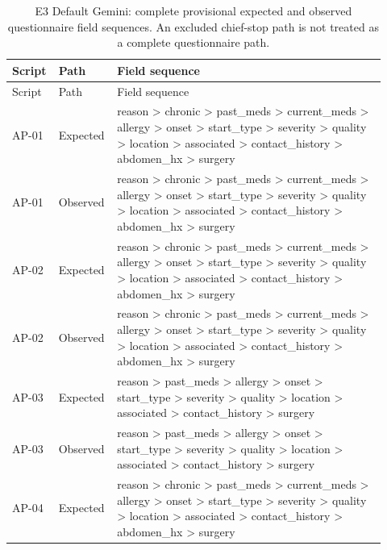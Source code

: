 \begingroup\small\setlength{\tabcolsep}{3pt}\renewcommand{\arraystretch}{1.15}
\begin{longtable}{>{\raggedright\arraybackslash}p{0.1\linewidth}>{\raggedright\arraybackslash}p{0.12\linewidth}>{\raggedright\arraybackslash}p{0.7\linewidth}}
\caption{E3 Default Gemini: complete provisional expected and observed questionnaire field sequences. An excluded chief-stop path is not treated as a complete questionnaire path.}\label{sup:e3pathsdefault}\\\hline
Script & Path & Field sequence \\ \hline
\endfirsthead
\hline
Script & Path & Field sequence \\ \hline
\endhead
\hline\endfoot
\hline\endlastfoot
AP-\allowbreak{}01 & Expected & reason > chronic > past\_\allowbreak{}meds > current\_\allowbreak{}meds > allergy > onset > start\_\allowbreak{}type > severity > quality > location > associated > contact\_\allowbreak{}history > abdomen\_\allowbreak{}hx > surgery \\
AP-\allowbreak{}01 & Observed & reason > chronic > past\_\allowbreak{}meds > current\_\allowbreak{}meds > allergy > onset > start\_\allowbreak{}type > severity > quality > location > associated > contact\_\allowbreak{}history > abdomen\_\allowbreak{}hx > surgery \\
AP-\allowbreak{}02 & Expected & reason > chronic > past\_\allowbreak{}meds > current\_\allowbreak{}meds > allergy > onset > start\_\allowbreak{}type > severity > quality > location > associated > contact\_\allowbreak{}history > abdomen\_\allowbreak{}hx > surgery \\
AP-\allowbreak{}02 & Observed & reason > chronic > past\_\allowbreak{}meds > current\_\allowbreak{}meds > allergy > onset > start\_\allowbreak{}type > severity > quality > location > associated > contact\_\allowbreak{}history > abdomen\_\allowbreak{}hx > surgery \\
AP-\allowbreak{}03 & Expected & reason > past\_\allowbreak{}meds > allergy > onset > start\_\allowbreak{}type > severity > quality > location > associated > contact\_\allowbreak{}history > surgery \\
AP-\allowbreak{}03 & Observed & reason > past\_\allowbreak{}meds > allergy > onset > start\_\allowbreak{}type > severity > quality > location > associated > contact\_\allowbreak{}history > surgery \\
AP-\allowbreak{}04 & Expected & reason > chronic > past\_\allowbreak{}meds > current\_\allowbreak{}meds > allergy > onset > start\_\allowbreak{}type > severity > quality > location > associated > contact\_\allowbreak{}history > abdomen\_\allowbreak{}hx > surgery \\

\end{longtable}
